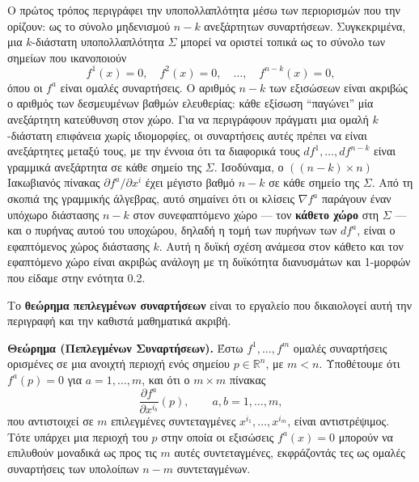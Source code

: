 \documentclass[12pt]{article}
\begin{document}
Ο πρώτος τρόπος περιγράφει την υποπολλαπλότητα μέσω των περιορισμών που την ορίζουν: ως το σύνολο μηδενισμού $n-k$ ανεξάρτητων συναρτήσεων. Συγκεκριμένα, μια $k$-διάστατη υποπολλαπλότητα $\Sigma$ μπορεί να οριστεί τοπικά ως το σύνολο των σημείων που ικανοποιούν
\[
f^1(x) = 0, \quad f^2(x) = 0, \quad \dots, \quad f^{n-k}(x) = 0,
\]
όπου οι $f^a$ είναι ομαλές συναρτήσεις. Ο αριθμός $n-k$ των εξισώσεων είναι ακριβώς ο αριθμός των δεσμευμένων βαθμών ελευθερίας: κάθε εξίσωση ``παγώνει'' μία ανεξάρτητη κατεύθυνση στον χώρο. Για να περιγράφουν πράγματι μια ομαλή $k$-διάστατη επιφάνεια χωρίς ιδιομορφίες, οι συναρτήσεις αυτές πρέπει να είναι ανεξάρτητες μεταξύ τους, με την έννοια ότι τα διαφορικά τους $df^1, \dots, df^{n-k}$ είναι γραμμικά ανεξάρτητα σε κάθε σημείο της $\Sigma$. Ισοδύναμα, ο $((n-k) \times n)$ Ιακωβιανός πίνακας $\partial f^a / \partial x^i$ έχει μέγιστο βαθμό $n-k$ σε κάθε σημείο της $\Sigma$. Από τη σκοπιά της γραμμικής άλγεβρας, αυτό σημαίνει ότι οι κλίσεις $\nabla f^a$ παράγουν έναν υπόχωρο διάστασης $n-k$ στον συνεφαπτόμενο χώρο --- τον \textbf{κάθετο χώρο} στη $\Sigma$ --- και ο πυρήνας αυτού του υποχώρου, δηλαδή η τομή των πυρήνων των $df^a$, είναι ο εφαπτόμενος χώρος διάστασης $k$. Αυτή η δυϊκή σχέση ανάμεσα στον κάθετο και τον εφαπτόμενο χώρο είναι ακριβώς ανάλογη με τη δυϊκότητα διανυσμάτων και 1-μορφών που είδαμε στην ενότητα 0.2.

Το \textbf{θεώρημα πεπλεγμένων συναρτήσεων} είναι το εργαλείο που δικαιολογεί αυτή την περιγραφή και την καθιστά μαθηματικά ακριβή.

\textbf{Θεώρημα (Πεπλεγμένων Συναρτήσεων).} Έστω $f^1, \dots, f^{m}$ ομαλές συναρτήσεις ορισμένες σε μια ανοιχτή περιοχή ενός σημείου $p \in \mathbb{R}^n$, με $m < n$. Υποθέτουμε ότι $f^a(p) = 0$ για $a = 1, \dots, m$, και ότι ο $m \times m$ πίνακας
\[
\frac{\partial f^a}{\partial x^{i_b}}(p), \qquad a, b = 1, \dots, m,
\]
που αντιστοιχεί σε $m$ επιλεγμένες συντεταγμένες $x^{i_1}, \dots, x^{i_m}$, είναι αντιστρέψιμος. Τότε υπάρχει μια περιοχή του $p$ στην οποία οι εξισώσεις $f^a(x) = 0$ μπορούν να επιλυθούν μοναδικά ως προς τις $m$ αυτές συντεταγμένες, εκφράζοντάς τες ως ομαλές συναρτήσεις των υπολοίπων $n-m$ συντεταγμένων.
\end{document}
